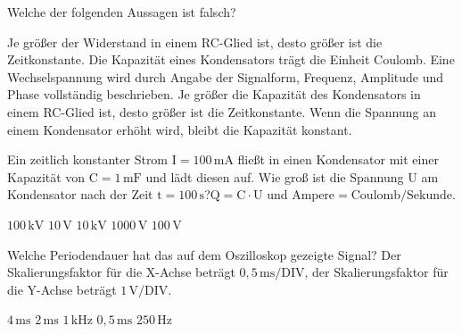 \documentclass[11pt]{exam}
\begin{document}
\setlength{\voffset}{-0.5in}
\setlength{\headsep}{5pt}

\hspace{2mm}
 \hspace{5mm}
\vspace{4mm}

\begin{questions}

\question Welche der folgenden Aussagen ist falsch?

\begin{choices}
	\choice Je größer der Widerstand in einem RC-Glied ist, desto größer ist die Zeitkonstante.
	\choice Die Kapazität eines Kondensators trägt die Einheit Coulomb.
	\choice Eine Wechselspannung wird durch Angabe der Signalform, Frequenz, Amplitude und Phase vollständig beschrieben.
	\choice Je größer die Kapazität des Kondensators in einem RC-Glied ist, desto größer ist die Zeitkonstante.
	\choice Wenn die Spannung an einem Kondensator erhöht wird, bleibt die Kapazität konstant.
\end{choices}

\vspace{3mm}\question Ein zeitlich konstanter Strom \(\mathrm{I=100\,mA}\) fließt in einen Kondensator mit einer Kapazität von \(\mathrm{C=1\,mF}\) und lädt diesen auf. Wie groß ist die Spannung \(\mathrm{U}\) am Kondensator nach der Zeit \(\mathrm{t=100\,s}\)?\(\mathrm{Q=C \cdot U}\) und \(\mathrm{Ampere=Coulomb/Sekunde}\).

\begin{choices}
	\choice \(\mathrm{100\,kV}\)
	\choice \(\mathrm{10\,V}\)
	\choice \(\mathrm{10\,kV}\)
	\choice \(\mathrm{1000\,V}\)
	\choice \(\mathrm{100\,V}\)
\end{choices}

\vspace{3mm}\question Welche Periodendauer hat das auf dem Oszilloskop gezeigte Signal? Der Skalierungsfaktor für die X-Achse beträgt \(\mathrm{0,5\,ms/DIV}\), der Skalierungsfaktor für die Y-Achse beträgt \(\mathrm{1\,V/DIV}\).

\begin{choices}
	\choice \(\mathrm{4\,ms}\)
	\choice \(\mathrm{2\,ms}\)
	\choice \(\mathrm{1\,kHz}\)
	\choice \(\mathrm{0,5\,ms}\)
	\choice \(\mathrm{250\,Hz}\)
\end{choices}


\end{questions}
\end{document}
